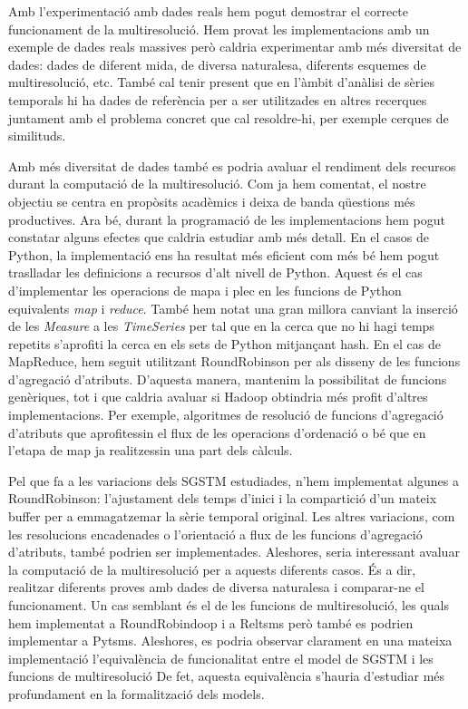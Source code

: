 
Amb l'experimentació amb dades reals hem pogut demostrar el correcte
funcionament de la multiresolució.  Hem provat les implementacions amb
un exemple de dades reals massives però caldria experimentar amb més
diversitat de dades: dades de diferent mida, de diversa naturalesa,
diferents esquemes de multiresolució, etc. També cal tenir present que
en l'àmbit d'anàlisi de sèries temporals hi ha dades de
referència \parencite{keogh02} per a ser utilitzades en altres
recerques juntament amb el problema concret que cal resoldre-hi, per
exemple cerques de similituds.


Amb més diversitat de dades també es podria avaluar el rendiment dels
recursos durant la computació de la multiresolució. Com ja hem
comentat, el nostre objectiu se centra en propòsits acadèmics i deixa
de banda qüestions més productives. Ara bé, durant la programació de
les implementacions hem pogut constatar alguns efectes que caldria
estudiar amb més detall.  En el casos de Python, la implementació ens
ha resultat més eficient com més bé hem pogut traslladar les
definicions a recursos d'alt nivell de Python. Aquest és el cas
d'implementar les operacions de mapa i plec en les funcions de Python
equivalents \emph{map} i \emph{reduce}. També hem notat una gran
millora canviant la inserció de les \emph{Measure} a les
\emph{TimeSeries} per tal que en la cerca que no hi hagi temps
repetits s'aprofiti la cerca en els sets de Python mitjançant
hash. %
En el cas de MapReduce, hem seguit utilitzant RoundRobinson per als
disseny de les funcions d'agregació d'atributs. D'aquesta manera,
mantenim la possibilitat de funcions genèriques, tot i que caldria
avaluar si Hadoop obtindria més profit d'altres implementacions. Per
exemple, algoritmes de resolució de funcions d'agregació d'atributs
que aprofitessin el flux de les operacions d'ordenació o bé que en
l'etapa de map ja realitzessin una part dels càlculs.



Pel que fa a les variacions dels \gls{SGSTM} estudiades, n'hem
implementat algunes a RoundRobinson: l'ajustament dels temps d'inici i
la compartició d'un mateix buffer per a emmagatzemar la sèrie temporal
original. Les altres variacions, com les resolucions encadenades o
l'orientació a flux de les funcions d'agregació d'atributs, també
podrien ser implementades. Aleshores, seria interessant avaluar la
computació de la multiresolució per a aquests diferents casos. És a
dir, realitzar diferents proves amb dades de diversa naturalesa i
comparar-ne el funcionament. Un cas semblant és el de les funcions de
multiresolució, les quals hem implementat a RoundRobindoop i a Reltsms
però també es podrien implementar a Pytsms. Aleshores, es podria
observar clarament en una mateixa implementació l'equivalència de
funcionalitat entre el model de SGSTM i les funcions de multiresolució
De fet, aquesta equivalència s'hauria d'estudiar més profundament en
la formalització dels models.








